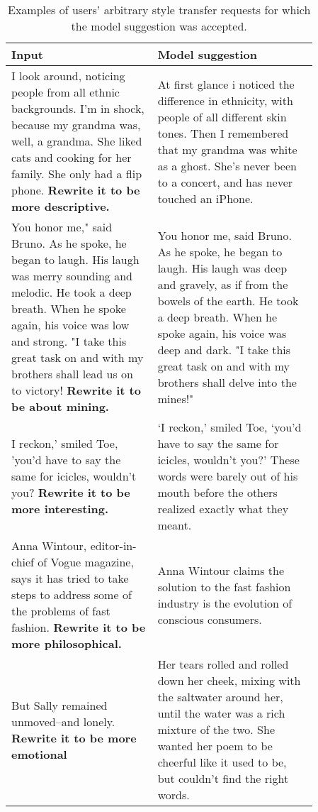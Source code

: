 \begin{table*}[ht]
\begin{adjustwidth}{-2cm}{}
    \small
    \centering
    \def\arraystretch{1.5}%
    \begin{tabular}{p{0.41\linewidth} p{0.45\linewidth}}
    \toprule
      \textbf{Input} & \textbf{Model suggestion} \\ \hline
      I look around, noticing people from all ethnic backgrounds. I’m in shock, because my grandma was, well, a grandma. She liked cats and cooking for her family. She only had a flip phone. \newline \textbf{Rewrite it to be more descriptive.} & At first glance i noticed the difference in ethnicity, with people of all different skin tones. Then I remembered that my grandma was white as a ghost. She's never been to a concert, and has never touched an iPhone. \\ \hline
      You honor me," said Bruno. As he spoke, he began to laugh. His laugh was merry sounding and melodic. He took a deep breath. When he spoke again, his voice was low and strong. "I take this great task on and with my brothers shall lead us on to victory! \newline \textbf{Rewrite it to be about mining.} & You honor me, said Bruno. As he spoke, he began to laugh. His laugh was deep and gravely, as if from the bowels of the earth. He took a deep breath. When he spoke again, his voice was deep and dark. "I take this great task on and with my brothers shall delve into the mines!" \\ \hline
      I reckon,' smiled Toe, 'you'd have to say the same for icicles, wouldn't you? \newline \textbf{Rewrite it to be more interesting.} & ‘I reckon,’ smiled Toe, ‘you’d have to say the same for icicles, wouldn’t you?’ These words were barely out of his mouth before the others realized exactly what they meant.\\ \hline
      Anna Wintour, editor-in-chief of Vogue magazine, says it has tried to take steps to address some of the problems of fast fashion. \newline \textbf{Rewrite it to be more philosophical.} & Anna Wintour claims the solution to the fast fashion industry is the evolution of conscious consumers. \\ \hline
      But Sally remained unmoved--and lonely. \newline \textbf{Rewrite it to be more emotional} & Her tears rolled and rolled down her cheek, mixing with the saltwater around her, until the water was a rich mixture of the two. She wanted her poem to be cheerful like it used to be, but couldn't find the right words. \\
    \bottomrule
    \end{tabular}
    \caption{Examples of users' arbitrary style transfer requests for which the model suggestion was accepted.}
    \label{tab:selected_usage_examples}
    \end{adjustwidth}
\end{table*}